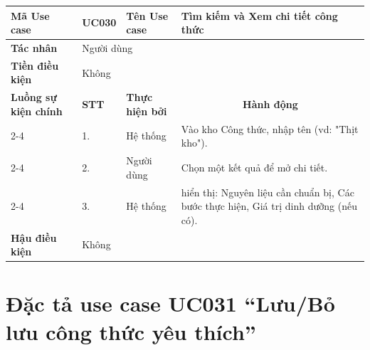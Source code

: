 \begin{longtable}{|p{2.7cm}|p{0.8cm}|p{2.6cm}|p{7.3cm}|}
\hline
\cellcolor[HTML]{D5F5E3}\textbf{Mã Use case} & \multicolumn{1}{l|}{UC030} & \cellcolor[HTML]{D5F5E3}\textbf{Tên Use case} & Tìm kiếm và Xem chi tiết công thức \\ \hline
\cellcolor[HTML]{D5F5E3}\textbf{Tác nhân} & \multicolumn{3}{p{10.7cm}|}{Người dùng} \\ \hline
\cellcolor[HTML]{D5F5E3}\textbf{Tiền điều kiện} & \multicolumn{3}{p{10.7cm}|}{Không} \\ \hline

\cellcolor[HTML]{D5F5E3}\textbf{Luồng sự kiện chính} & \cellcolor[HTML]{FDEBD0}\textbf{STT} & \cellcolor[HTML]{FDEBD0}\textbf{Thực hiện bởi} & \multicolumn{1}{c|}{\cellcolor[HTML]{FDEBD0}\textbf{Hành động}} \\ \cline{2-4} 
\cellcolor[HTML]{D5F5E3} & 1. & Hệ thống & Vào kho Công thức, nhập tên (vd: "Thịt kho"). \\ \cline{2-4} 
\cellcolor[HTML]{D5F5E3} & 2. & Người dùng & Chọn một kết quả để mở chi tiết. \\ \cline{2-4} 
\cellcolor[HTML]{D5F5E3} & 3. & Hệ thống & hiển thị: Nguyên liệu cần chuẩn bị, Các bước thực hiện, Giá trị dinh dưỡng (nếu có). \\ \hline

\cellcolor[HTML]{D5F5E3}\textbf{Hậu điều kiện} & \multicolumn{3}{p{10.7cm}|}{Không} \\ \hline
\end{longtable}
\endgroup

\section{Đặc tả use case UC031 ``Lưu/Bỏ lưu công thức yêu thích''}
\vspace{0.5cm}

\begingroup
\renewcommand{\arraystretch}{1.5}

